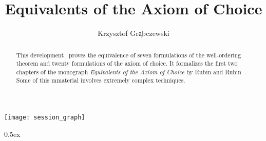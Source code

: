 \documentclass[11pt,a4paper]{article}
\begin{document}
\title{Equivalents of the Axiom of Choice}
\author{Krzysztof Gr\c{a}bczewski}
\maketitle

\begin{abstract}
  This development~\cite{paulson-gr} proves the equivalence of seven
  formulations of the well-ordering theorem and twenty formulations of the
  axiom of choice. It formalizes the first two chapters of the monograph
  \emph{Equivalents of the Axiom of Choice} by Rubin and
  Rubin~\cite{rubin&rubin}. Some of this mmaterial involves extremely complex
  techniques.
\end{abstract}

\tableofcontents

\begin{center}
  \texttt{[image: session\_graph]}
\end{center}

\newpage

\parindent 0pt\parskip 0.5ex





\end{document}
